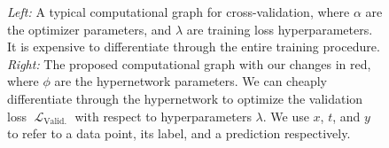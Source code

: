 \documentclass{article} %
\newcommand{\param}{\mathrm{w}} %
\newcommand{\hyper}{\lambda} %
\newcommand{\lossSymbol}{\mathop{\mathcal{L}}} %
\newcommand{\lossSymbolOuter}{\lossSymbol_{\mathrm{Valid.}}} %
\newcommand{\responseParam}{\phi} %
\begin{document}
\begin{figure}
\caption{%
\emph{Left:} A typical computational graph for cross-validation, where $\alpha$ are the optimizer parameters, and $\hyper$ are training loss hyperparameters.
It is expensive to differentiate through the entire training procedure.
\emph{Right:} The proposed computational graph with our changes in {\color{red} red}, where $\responseParam$ are the hypernetwork parameters.
We can cheaply differentiate through the hypernetwork to optimize the validation loss $\lossSymbolOuter$ with respect to hyperparameters $\hyper$.
We use $x$, $t$, and $y$ to refer to a data point, its label, and a prediction respectively.}
\end{figure}
%
\end{document}
